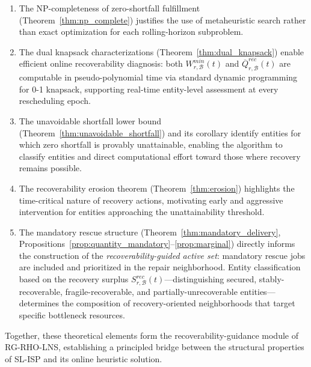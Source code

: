 \begin{enumerate}
    \item The NP-completeness of zero-shortfall fulfillment (Theorem~\ref{thm:np_complete}) justifies the use of metaheuristic search rather than exact optimization for each rolling-horizon subproblem.
    \item The dual knapsack characterizations (Theorem~\ref{thm:dual_knapsack}) enable efficient online recoverability diagnosis: both $W_{r,\mathcal B}^{min}(t)$ and $\overline Q_{r,\mathcal B}^{rec}(t)$ are computable in pseudo-polynomial time via standard dynamic programming for 0-1 knapsack, supporting real-time entity-level assessment at every rescheduling epoch.
    \item The unavoidable shortfall lower bound (Theorem~\ref{thm:unavoidable_shortfall}) and its corollary identify entities for which zero shortfall is provably unattainable, enabling the algorithm to classify entities and direct computational effort toward those where recovery remains possible.
    \item The recoverability erosion theorem (Theorem~\ref{thm:erosion}) highlights the time-critical nature of recovery actions, motivating early and aggressive intervention for entities approaching the unattainability threshold.
    \item The mandatory rescue structure (Theorem~\ref{thm:mandatory_delivery}, Propositions~\ref{prop:quantity_mandatory}--\ref{prop:marginal}) directly informs the construction of the \emph{recoverability-guided active set}: mandatory rescue jobs are included and prioritized in the repair neighborhood. Entity classification based on the recovery surplus $S_{r,\mathcal B}^{rec}(t)$---distinguishing secured, stably-recoverable, fragile-recoverable, and partially-unrecoverable entities---determines the composition of recovery-oriented neighborhoods that target specific bottleneck resources.
\end{enumerate}

Together, these theoretical elements form the recoverability-guidance module of RG-RHO-LNS, establishing a principled bridge between the structural properties of SL-ISP and its online heuristic solution.
